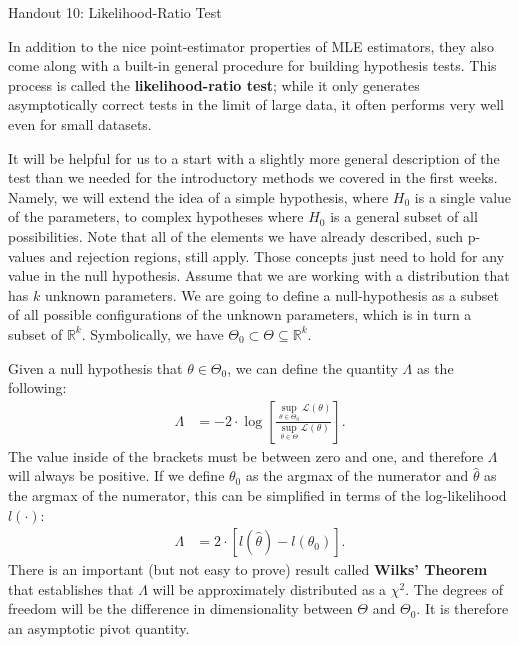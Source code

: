 \documentclass{tufte-handout}
\begin{document}
\justify

{\LARGE Handout 10: Likelihood-Ratio Test}

\vspace*{18pt}

\noindent
In addition to the nice point-estimator properties of MLE estimators,
they also come along with a built-in general procedure for building 
hypothesis tests. This process is called the \textbf{likelihood-ratio test};
while it only generates asymptotically correct tests in the limit of large
data, it often performs very well even for small datasets.

It will be helpful for us to a start with a slightly more general description
of the test than we needed for the introductory methods we covered in the
first weeks. Namely, we will extend the idea of a simple hypothesis,
where $H_0$ is a single value of the parameters, to complex hypotheses 
where $H_0$ is a general subset of all possibilities. Note that all of the
elements we have already described, such p-values and rejection regions,
still apply. Those concepts just need to hold for any value in the null
hypothesis. Assume that we are working with a distribution that has $k$
unknown parameters. We are going to define a null-hypothesis as a subset
of all possible configurations of the unknown parameters, which is in
turn a subset of $\mathbb{R}^k$. Symbolically, we have 
$\Theta_0 \subset \Theta \subseteq \mathbb{R}^k$.

Given a null hypothesis that $\theta \in \Theta_0$, we can define the
quantity $\Lambda$ as the following:
\begin{align*}
\Lambda &= -2 \cdot \log \left[ \frac{
  \sup_{\theta \in \Theta_0} \mathcal{L}(\theta)
}{
  \sup_{\theta \in \Theta} \mathcal{L}(\theta)
} \right].
\end{align*}
The value inside of the brackets must be between zero and one, and
therefore $\Lambda$ will always be positive. If we define $\theta_0$ as the
argmax of the numerator and $\hat{\theta}$ as the argmax of the numerator,
this can be simplified in terms of the log-likelihood $l(\cdot)$:
\begin{align*}
\Lambda &= 2 \cdot \left[ l(\hat{\theta}) - l(\theta_0) \right].
\end{align*}
There is an important (but not easy to prove) result called
\textbf{Wilks' Theorem} that establishes that $\Lambda$ will be 
approximately distributed as a $\chi^2$. The degrees of freedom
will be the difference in dimensionality between $\Theta$ and
$\Theta_0$. It is therefore an asymptotic pivot quantity. 
\end{document}
